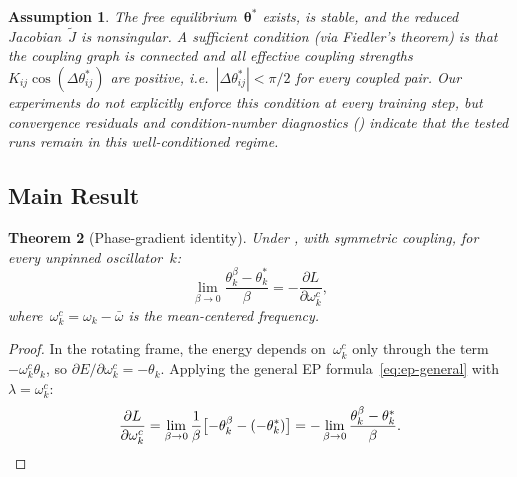 \documentclass[11pt,a4paper]{article}
\newtheorem{theorem}{Theorem}
\newtheorem{assumption}[theorem]{Assumption}
\newcommand{\pd}[2]{\frac{\partial #1}{\partial #2}}
\newcommand{\thetastar}{\bm{\theta}^*}
\begin{document}
\begin{assumption}
  \label{ass:equilibrium}
  The free equilibrium~$\thetastar$ exists, is stable, and the reduced
  Jacobian~$\tilde{J}$ is nonsingular. A sufficient condition (via
  Fiedler's theorem) is that the coupling graph is connected and all
  effective coupling strengths~$K_{ij}\cos(\Delta\theta_{ij}^*)$ are
  positive, i.e.\ $|\Delta\theta_{ij}^*| < \pi/2$ for every coupled
  pair. Our experiments do not explicitly enforce this condition at every
  training step, but convergence residuals and condition-number
  diagnostics () indicate that the tested runs
  remain in this well-conditioned regime.
\end{assumption}

\subsection{Main Result}

\begin{theorem}[Phase-gradient identity]
  \label{thm:freq-gradient}
  Under , with symmetric coupling, for every
  unpinned oscillator~$k$:
  \begin{equation}
    \lim_{\beta \to 0}
    \frac{\theta_k^\beta - \theta_k^*}{\beta}
    = -\pd{L}{\omega_k^c},
    \label{eq:freq-identity}
  \end{equation}
  where~$\omega_k^c = \omega_k - \bar{\omega}$ is the mean-centered
  frequency.
\end{theorem}

\begin{proof}
  In the rotating frame, the energy depends on~$\omega_k^c$ only through
  the term~$-\omega_k^c\theta_k$, so
  $\partial E / \partial \omega_k^c = -\theta_k$. Applying the general EP
  formula~\eqref{eq:ep-general} with~$\lambda = \omega_k^c$:
  \[
    \pd{L}{\omega_k^c}
    = \lim_{\beta \to 0} \frac{1}{\beta}
      \bigl[-\theta_k^\beta - (-\theta_k^*)\bigr]
    = -\lim_{\beta \to 0}
      \frac{\theta_k^\beta - \theta_k^*}{\beta}.
      \qedhere
  \]
\end{proof}
\end{document}
